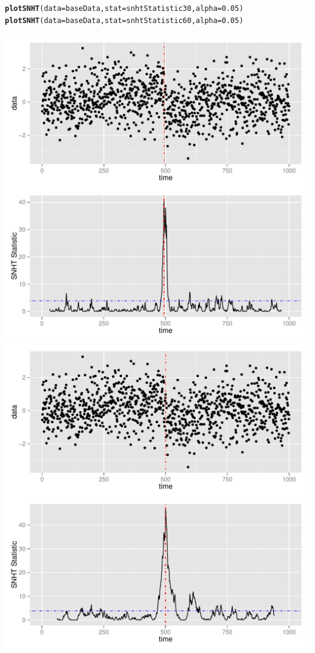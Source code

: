 \documentclass[nojss]{jss}\usepackage[]{graphicx}\usepackage[]{color}
\makeatletter
\def\maxwidth{ %
  \ifdim\Gin@nat@width>\linewidth
    \linewidth
  \else
    \Gin@nat@width
  \fi
}
\newcommand{\hlnum}[1]{\textcolor[rgb]{0.686,0.059,0.569}{#1}}%
\newcommand{\hlstd}[1]{\textcolor[rgb]{0.345,0.345,0.345}{#1}}%
\newcommand{\hlkwc}[1]{\textcolor[rgb]{0.333,0.667,0.333}{#1}}%
\newcommand{\hlkwd}[1]{\textcolor[rgb]{0.737,0.353,0.396}{\textbf{#1}}}%
\newenvironment{kframe}{%
 \def\at@end@of@kframe{}%
 \ifinner\ifhmode%
  \def\at@end@of@kframe{\end{minipage}}%
  \begin{minipage}{\columnwidth}%
 \fi\fi%
 \def\FrameCommand##1{\hskip\@totalleftmargin \hskip-\fboxsep
 \colorbox{shadecolor}{##1}\hskip-\fboxsep
     \hskip-\linewidth \hskip-\@totalleftmargin \hskip\columnwidth}%
 \MakeFramed {\advance\hsize-\width
   \@totalleftmargin\z@ \linewidth\hsize
   \@setminipage}}%
 {\par\unskip\endMakeFramed%
 \at@end@of@kframe}
\newenvironment{knitrout}{}{} %
\makeatother
\begin{document}
\begin{knitrout}
\color{fgcolor}\begin{kframe}
\begin{alltt}
\hlkwd{plotSNHT}\hlstd{(}\hlkwc{data} \hlstd{= baseData,} \hlkwc{stat} \hlstd{= snhtStatistic30,} \hlkwc{alpha} \hlstd{=} \hlnum{0.05}\hlstd{)}
\hlkwd{plotSNHT}\hlstd{(}\hlkwc{data} \hlstd{= baseData,} \hlkwc{stat} \hlstd{= snhtStatistic60,} \hlkwc{alpha} \hlstd{=} \hlnum{0.05}\hlstd{)}
\end{alltt}
\end{kframe}

{\centering \includegraphics[width=\maxwidth]{figure/unnamed-chunk-6-1} 
\includegraphics[width=\maxwidth]{figure/unnamed-chunk-6-2} 

}
\end{knitrout}
\end{document}
